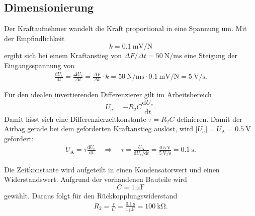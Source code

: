 \subsection{Dimensionierung}

Der Kraftaufnehmer wandelt die Kraft proportional in eine Spannung um. Mit der
Empfindlichkeit
\begin{equation}
	k = \SI{0.1}{\milli\volt\per\newton}
\end{equation}
ergibt sich bei einem Kraftanstieg von
$\Delta F / \Delta t = \SI{50}{\newton\per\milli\second}$
eine Steigung der Eingangsspannung von
\begin{gather}
	\frac{\mathrm{d}U_e}{\mathrm{d}t}
	= \frac{\Delta U_e}{\Delta t}
	= \frac{\Delta F}{\Delta t} \cdot k
	= \SI{50}{\newton\per\milli\second}
	\cdot \SI{0.1}{\milli\volt\per\newton}
	= \SI{5}{\volt\per\second}.
\end{gather}

Für den idealen invertierenden Differenzierer gilt im Arbeitsbereich
\begin{equation}
	U_a = - R_2 C \frac{\mathrm{d}U_e}{\mathrm{d}t}.
\end{equation}
Damit lässt sich eine Differenzierzeitkonstante
$\tau = R_2 C$
definieren.
Damit der Airbag gerade bei dem geforderten Kraftanstieg auslöst, wird
$|U_a| = U_\mathrm{A} = \SI{0.5}{\volt}$ gefordert:
\begin{gather}
	U_\mathrm{A}
	= \tau \frac{\mathrm{d}U_e}{\mathrm{d}t}
	\quad\Rightarrow\quad
	\tau
	= \frac{U_\mathrm{A}}{\mathrm{d}U_e / \mathrm{d}t}
	= \frac{\SI{0.5}{\volt}}{\SI{5}{\volt\per\second}}
	= \SI{0.1}{\second}.
\end{gather}

Die Zeitkonstante wird aufgeteilt in einen Kondensatorwert und einen Widerstandswert.
Aufgrund der vorhandenen Bauteile wird
\begin{equation}
	C = \SI{1}{\micro\farad}
\end{equation}
gewählt. Daraus folgt für den Rückkopplungswiderstand
\begin{gather}
	R_2
	= \frac{\tau}{C}
	= \frac{\SI{0.1}{\second}}{\SI{1}{\micro\farad}}
	= \SI{100}{\kilo\ohm}.
\end{gather}

